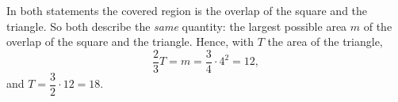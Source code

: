 In both statements the covered region is the overlap of the square and the triangle. So both describe the \emph{same} quantity: the largest possible area $m$ of the overlap of the square and the triangle. Hence, with $T$ the area of the triangle,
\[
\dfrac{2}{3}T=m=\dfrac{3}{4}\cdot4^2=12,
\]
and $T=\dfrac{3}{2}\cdot12=\boxed{18}$.

